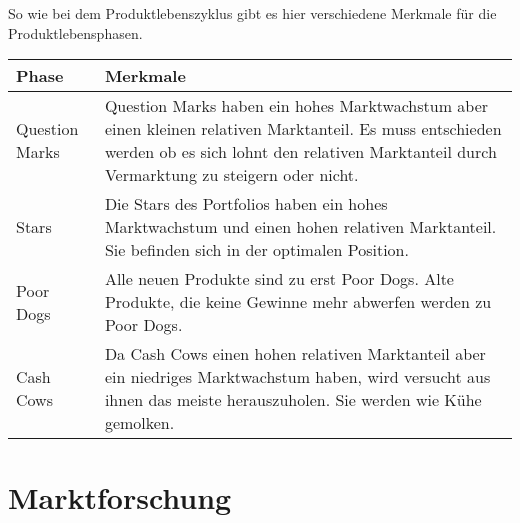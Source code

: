 \begin{flushleft}
    So wie bei dem Produktlebenszyklus gibt es hier verschiedene Merkmale für die Produktlebensphasen.
\end{flushleft}
\begin{center}
\begin{tabular}{|l|p{8cm}|}
    \hline
    \textbf{Phase} & \textbf{Merkmale} \\
    \hline
    Question Marks & Question Marks haben ein hohes Marktwachstum aber einen kleinen relativen Marktanteil. Es muss entschieden werden ob es sich lohnt den relativen Marktanteil durch Vermarktung zu steigern oder nicht. \\
    \hline
    Stars & Die Stars des Portfolios haben ein hohes Marktwachstum und einen hohen relativen Marktanteil. Sie befinden sich in der optimalen Position. \\
    \hline
    Poor Dogs & Alle neuen Produkte sind zu erst Poor Dogs. Alte Produkte, die keine Gewinne mehr abwerfen werden zu Poor Dogs. \\
    \hline
    Cash Cows & Da Cash Cows einen hohen relativen Marktanteil aber ein niedriges Marktwachstum haben, wird versucht aus ihnen das meiste herauszuholen. Sie werden wie Kühe gemolken. \\
    \hline
\end{tabular}
\end{center}

\section{Marktforschung}
